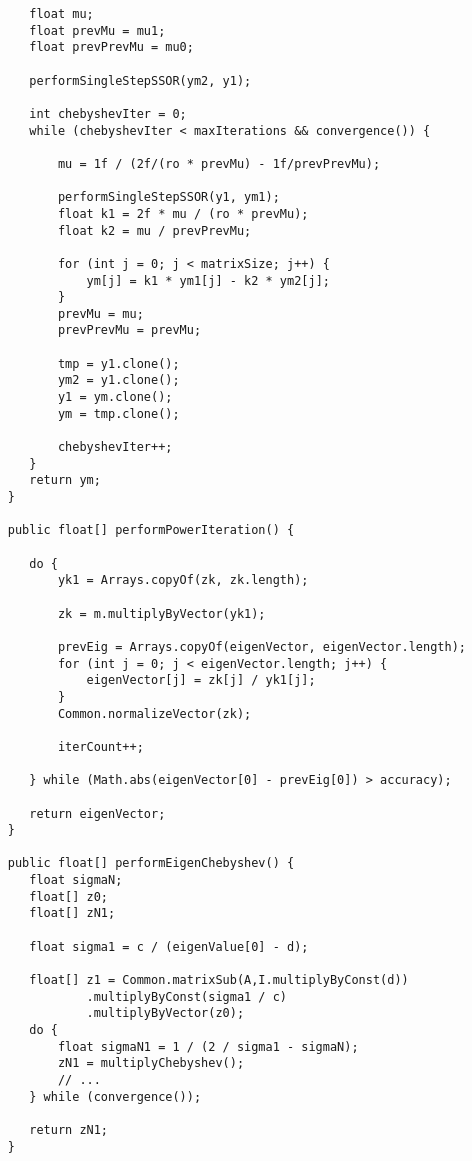 \documentclass[12pt]{article}
\begin{document}
{\begin{lstlisting}
        float mu;
        float prevMu = mu1;
        float prevPrevMu = mu0;

        performSingleStepSSOR(ym2, y1);

        int chebyshevIter = 0;
        while (chebyshevIter < maxIterations && convergence()) {

            mu = 1f / (2f/(ro * prevMu) - 1f/prevPrevMu);

            performSingleStepSSOR(y1, ym1);
            float k1 = 2f * mu / (ro * prevMu);
            float k2 = mu / prevPrevMu;

            for (int j = 0; j < matrixSize; j++) {
                ym[j] = k1 * ym1[j] - k2 * ym2[j];
            }
            prevMu = mu;
            prevPrevMu = prevMu;

            tmp = y1.clone();
            ym2 = y1.clone();
            y1 = ym.clone();
            ym = tmp.clone();

            chebyshevIter++;
        }
        return ym;
     }
    
     public float[] performPowerIteration() {

        do {
            yk1 = Arrays.copyOf(zk, zk.length);

            zk = m.multiplyByVector(yk1);

            prevEig = Arrays.copyOf(eigenVector, eigenVector.length);
            for (int j = 0; j < eigenVector.length; j++) {
                eigenVector[j] = zk[j] / yk1[j];
            }
            Common.normalizeVector(zk);

            iterCount++;

        } while (Math.abs(eigenVector[0] - prevEig[0]) > accuracy);

        return eigenVector;
     }
	
     public float[] performEigenChebyshev() {
        float sigmaN;
        float[] z0;
        float[] zN1;
        
        float sigma1 = c / (eigenValue[0] - d);
        
        float[] z1 = Common.matrixSub(A,I.multiplyByConst(d))
                .multiplyByConst(sigma1 / c)
                .multiplyByVector(z0);
        do {
            float sigmaN1 = 1 / (2 / sigma1 - sigmaN);
            zN1 = multiplyChebyshev();
            // ...
        } while (convergence());

        return zN1;
     }
	
	
        \end{lstlisting}
    }
    
\end{document}
